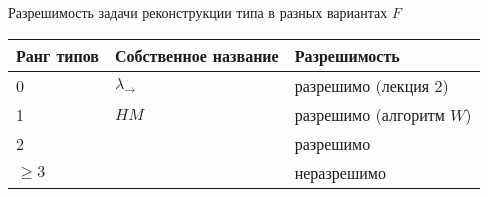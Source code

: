 \documentclass[aspectratio=169]{beamer}
\begin{document}
\begin{frame}{Разрешимость задачи реконструкции типа в разных вариантах $F$}
\begin{tabular}{lll}
Ранг типов & Собственное название & Разрешимость\\\hline
0 & $\lambda_\rightarrow$ & разрешимо (лекция 2)\\
1 & $HM$ & разрешимо (алгоритм $W$)\\
2 & & разрешимо\\
$\ge3$ & & неразрешимо
\end{tabular}
\end{frame}
\end{document}
